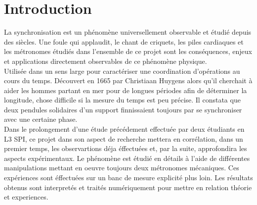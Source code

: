 \documentclass[a4paper,11pt]{report}
\begin{document}
\maketitle %
\newpage
{} \setcounter{page}{1} %
\newpage
\null
\thispagestyle{empty}
\newpage
{\tableofcontents}
\listoffigures
\newpage
\chapter*{Introduction}
 \setcounter{page}{1} %
	La synchronisation est un phénomène universellement observable et étudié depuis des siècles. Une foule qui applaudit, le chant de criquets, les piles cardiaques et les métronomes étudiés dans l'ensemble de ce projet sont les conséquences, enjeux et applications directement observables de ce phénomène physique.\\

	Utilisée dans un sens large pour caractériser une coordination d'opérations au cours du temps. Découvert en 1665 par Christiaan Huygens alors qu'il cherchait à aider les hommes partant en mer pour de longues périodes afin de déterminer la longitude, chose difficile si la mesure du temps est peu précise. Il constata que deux pendules solidaires d'un support finnissaient toujours par se synchroniser avec une certaine phase.\\

	Dans le prolongement d'une étude précédement effectuée par deux étudiants en L3 SPI, ce projet dans son aspect de recherche mettera en corrélation, dans un premier temps, les observartions déja éffectuées et, par la suite, approfondira les aspects expérimentaux. Le phénomène est étudié en détails à l'aide de différentes manipulations mettant en oeuvre toujours deux métronomes mécaniques. Ces expériences sont éffectuées sur un banc de mesure explicité plus loin. Les résultats obtenus sont interpretés et traités numériquement pour mettre en relation théorie et experiences.
\end{document}
